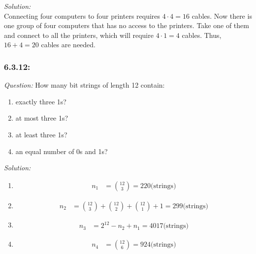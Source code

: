 \documentclass[a4paper]{article}
\begin{document}
\emph{Solution: }\\
Connecting four computers to four printers requires $4\cdot 4=16$ cables. Now there is one group of four computers that has no access to the printers. Take one of them and connect to all the printers, which will require $4\cdot1=4$ cables. Thus, $16+4=20$ cables are needed.

\subsubsection*{6.3.12:}
\textit{Question:} How many bit strings of length 12 contain:
\begin{enumerate} [label = (\alph*)]
	\item exactly three 1s?
	\item at most three 1s?
	\item at least three 1s?
	\item an equal number of 0s and 1s?
\end{enumerate}
\textit{Solution:}\\
\begin{enumerate} [label = (\alph*)]
	\item 
	      \begin{align*}
		      n_1 & = {12 \choose 3} = 220 \text{(strings)}
	      \end{align*}
	\item 
	      \begin{align*}
		      n_2 & = {12 \choose 3} + {12\choose 2} + {12 \choose 1} + 1 = 299 \text{(strings)}
	      \end{align*}
	\item 
	      \begin{align*}
		      n_3 & = 2^{12} - n_2 + n_1 = 4017 \text{(strings)}
	      \end{align*}
	\item 
	      \begin{align*}
		      n_4 & = {12 \choose 6} = 924 \text{(strings)}
	      \end{align*}
\end{enumerate}

\end{document}
